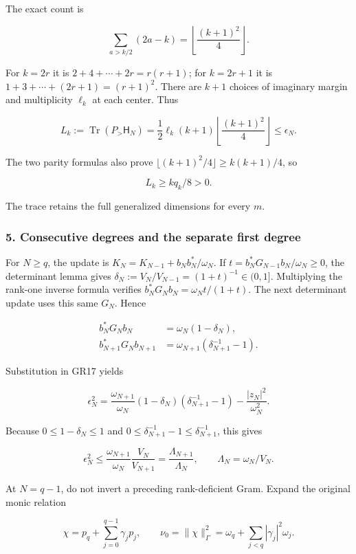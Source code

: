 The exact count is

\[
\sum_{a>k/2}(2a-k)=\left\lfloor\frac{(k+1)^2}{4}\right\rfloor.
\tag{GR19}
\]

For \(k=2r\) it is \(2+4+\cdots+2r=r(r+1)\); for \(k=2r+1\) it is \(1+3+\cdots+(2r+1)=(r+1)^2\). There are \(k+1\) choices of imaginary margin and multiplicity \(\ell_k\) at each center. Thus

\[
L_k:=\operatorname{Tr}(P_>\mathsf H_N)
=\frac12\ell_k(k+1)\left\lfloor\frac{(k+1)^2}{4}\right\rfloor
\le\epsilon_N.
\tag{GR20}
\]

The two parity formulas also prove \(\lfloor(k+1)^2/4\rfloor\ge k(k+1)/4\), so

\[
L_k\ge kq_k/8>0.
\tag{GR21}
\]

The trace retains the full generalized dimensions for every \(m\).

\subsubsection{5. Consecutive degrees and the separate first degree}\label{endpoint-gamma_review--consecutive-degrees-and-the-separate-first-degree}

For \(N\ge q\), the update is \(K_N=K_{N-1}+b_Nb_N^*/\omega_N\). If \(t=b_N^*G_{N-1}b_N/\omega_N\ge0\), the determinant lemma gives \(\delta_N:=V_N/V_{N-1}=(1+t)^{-1}\in(0,1]\). Multiplying the rank-one inverse formula verifies \(b_N^*G_Nb_N=\omega_Nt/(1+t)\). The next determinant update uses this same \(G_N\). Hence

\[
\begin{aligned}
b_N^*G_Nb_N&=\omega_N(1-\delta_N),\\
b_{N+1}^*G_Nb_{N+1}&=\omega_{N+1}(\delta_{N+1}^{-1}-1).
\end{aligned}
\tag{GR22}
\]

Substitution in GR17 yields

\[
\epsilon_N^2=
\frac{\omega_{N+1}}{\omega_N}(1-\delta_N)(\delta_{N+1}^{-1}-1)
-\frac{|z_N|^2}{\omega_N^2}.
\tag{GR23}
\]

Because \(0\le1-\delta_N\le1\) and \(0\le\delta_{N+1}^{-1}-1\le\delta_{N+1}^{-1}\), this gives

\[
\epsilon_N^2\le
\frac{\omega_{N+1}}{\omega_N}\frac{V_N}{V_{N+1}}
=\frac{\Lambda_{N+1}}{\Lambda_N},
\qquad \Lambda_N=\omega_N/V_N.
\tag{GR24}
\]

At \(N=q-1\), do not invert a preceding rank-deficient Gram. Expand the original monic relation

\[
\chi=p_q+\sum_{j=0}^{q-1}\gamma_jp_j,\qquad
\nu_0=\|\chi\|_\Gamma^2=\omega_q+\sum_{j<q}|\gamma_j|^2\omega_j.
\tag{GR25}
\]


